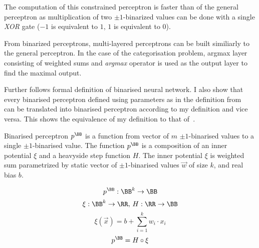 The computation of this constrained perceptron is faster than of the general perceptron
as multiplication of two $\pm 1$-binarized values can be done with a single \textit{XOR}
gate ($-1$ is equivalent to $1$, $1$ is equivalent to $0$).

From binarized perceptrons, multi-layered perceptrons can be built similiarly
to the general perceptron. In the case of the categorisation problem,
argmax layer consisting of weighted sums and \textit{argmax} operator is used
as the output layer to find the maximal output. %

Further follows formal definition of binarised neural network. I also show that
every binarised perceptron defined using parameters as in the definition 
from~\cite{zhang2021bdd4bnn} can be translated into binarised perceptron
according to my definition and vice versa. This shows the equivalence
of my definition to that of~\cite{zhang2021bdd4bnn}.

\sectionsep{}

\begin{definition}
Binarised perceptron $p^\BB$ is a function from vector of $m$ $\pm 1$-binarised values
to a single $\pm 1$-binarised value.
The function $p^\BB$ is a composition of an inner potential $\xi$
and a heavyside step function $H$. The inner potential $\xi$ is weighted sum
parametrized by static vector of $\pm 1$-binarised values
$\vec w$ of size $k$, and real bias $b$.

\begin{equation*}
	p^\BB: \BB^k \to \BB
\end{equation*}
\begin{equation*}
	\xi: \BB^k \to \RR, \,
	H: \RR \to \BB
\end{equation*}
\begin{equation*}
	\xi(\vec x) = b + \sum_{i=1}^k w_i\cdot x_i
\end{equation*}
\begin{equation*}
	p^\BB = H \circ \xi
\end{equation*}
\end{definition}

